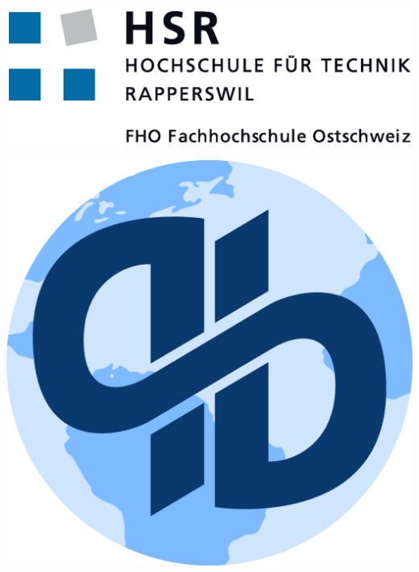 \documentclass[a4paper,parskip=full,DIV=14,BCOR=15mm]{scrreprt}
\begin{document}

\begin{titlepage}

\begin{flushleft}

\noindent\begin{minipage}[t]{0.49\textwidth}
	\begin{flushleft}
		\vspace{3pt} %
		\includegraphics[height=0.12\textheight]{img/hsr.eps}
	\end{flushleft}
\end{minipage}
\hfill
\begin{minipage}[t]{0.49\textwidth}
	\begin{flushright}
		\vspace{0pt} %
		\includegraphics[height=0.15\textheight]{img/qutebrowser.png}
	\end{flushright}
\end{minipage}
\\[4cm]


\end{flushleft}
\end{titlepage}
\end{document}
